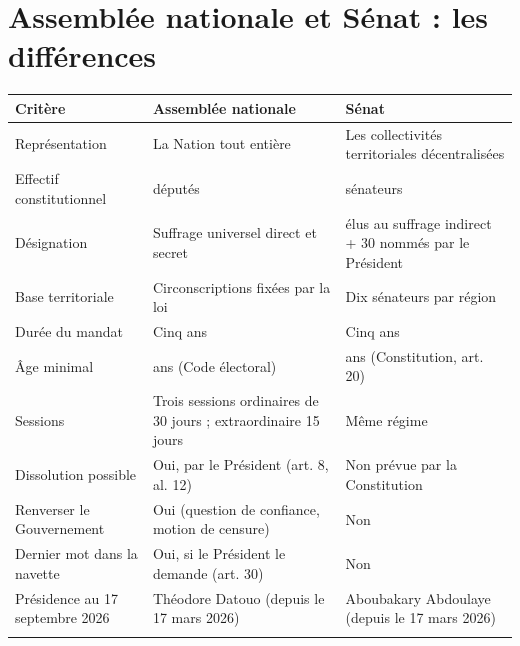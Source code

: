 \documentclass[11pt,a4paper,oneside]{report}
\begin{document}
\section{Assemblée nationale et Sénat : les différences}
\begin{longtable}{>{\raggedright\arraybackslash}p{} >{\raggedright\arraybackslash}p{} >{\raggedright\arraybackslash}p{}}
\toprule
\textbf{\color{navy}Critère} & \textbf{\color{navy}Assemblée nationale} & \textbf{\color{navy}Sénat} \\
\midrule\endhead
Représentation & La Nation tout entière & Les collectivités territoriales décentralisées \\
\addlinespace[1pt]
Effectif constitutionnel & 180 députés & 100 sénateurs \\
\addlinespace[1pt]
Désignation & Suffrage universel direct et secret & 70 élus au suffrage indirect + 30 nommés par le Président \\
\addlinespace[1pt]
Base territoriale & Circonscriptions fixées par la loi & Dix sénateurs par région \\
\addlinespace[1pt]
Durée du mandat & Cinq ans & Cinq ans \\
\addlinespace[1pt]
Âge minimal & 23 ans (Code électoral) & 40 ans (Constitution, art. 20) \\
\addlinespace[1pt]
Sessions & Trois sessions ordinaires de 30 jours ; extraordinaire 15 jours & Même régime \\
\addlinespace[1pt]
Dissolution possible & Oui, par le Président (art. 8, al. 12) & Non prévue par la Constitution \\
\addlinespace[1pt]
Renverser le Gouvernement & Oui (question de confiance, motion de censure) & Non \\
\addlinespace[1pt]
Dernier mot dans la navette & Oui, si le Président le demande (art. 30) & Non \\
\addlinespace[1pt]
Présidence au 17 septembre 2026 & Théodore Datouo (depuis le 17 mars 2026) & Aboubakary Abdoulaye (depuis le 17 mars 2026) \\
\addlinespace[1pt]
\bottomrule
\end{longtable}
\end{document}
